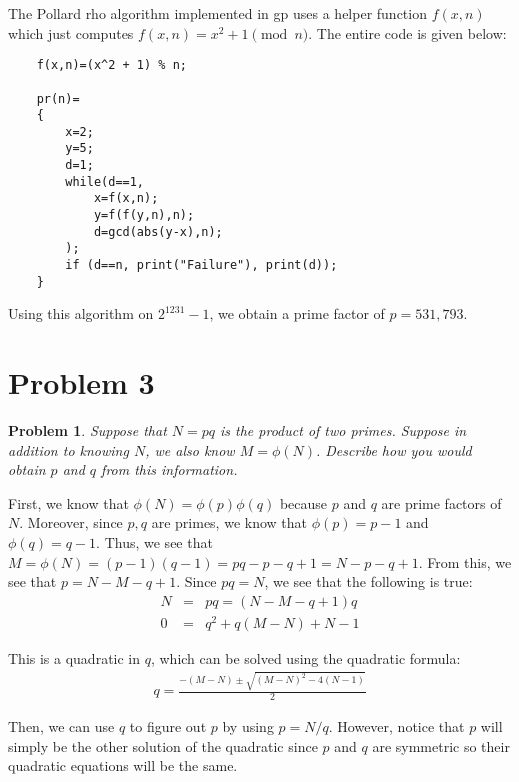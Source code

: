 \documentclass[psamsfonts]{amsart}
\newtheorem{prob}{Problem}[section]
\newenvironment{sol}{{\bfseries Solution}}{\qedsymbol}
\theoremstyle{definition}
\theoremstyle{remark}
\numberwithin{equation}{section}
\begin{document}
\begin{sol}
The Pollard rho algorithm implemented in gp uses a helper function $f(x,n)$ which just computes $f(x,n) = x^2 + 1 \pmod{n}$. The entire code is given below:
\begin{verbatim}    
    f(x,n)=(x^2 + 1) % n;

    pr(n)=
    {
        x=2;
        y=5;
        d=1;
        while(d==1,
            x=f(x,n);
            y=f(f(y,n),n);
            d=gcd(abs(y-x),n);
        );
        if (d==n, print("Failure"), print(d));
    }

\end{verbatim}

Using this algorithm on $2^{1231} - 1$, we obtain a prime factor of $p = 531,793$. 
\end{sol}

\section{Problem 3}

\begin{prob}
Suppose that $N = pq$ is the product of two primes. Suppose in addition to knowing $N$, we also know $M = \phi(N)$. Describe how you would obtain $p$ and $q$ from this information. 
\end{prob}

\begin{sol}
First, we know that $\phi(N) = \phi(p) \phi(q)$ because $p$ and $q$ are prime factors of $N$. Moreover, since $p,q$ are primes, we know that $\phi(p) = p - 1$ and $\phi(q) = q - 1$. Thus, we see that $M = \phi(N) = (p-1) (q-1) = pq - p - q + 1 = N - p - q + 1$. From this, we see that $p = N - M - q + 1$. Since $pq = N$, we see that the following is true:
\begin{eqnarray}
N &=& pq = (N - M - q + 1) q \\
0 &=& q^2 + q (M - N) + N - 1
\end{eqnarray}

This is a quadratic in $q$, which can be solved using the quadratic formula:
\begin{eqnarray}
q = \frac{-(M- N) \pm \sqrt{ (M-N)^2 - 4(N-1)}}{2}
\end{eqnarray}

Then, we can use $q$ to figure out $p$ by using $p = N/q$. However, notice that $p$ will  simply be the other solution of the quadratic since $p$ and $q$ are symmetric so their quadratic equations will be the same.  

\end{sol}
\end{document}

